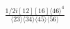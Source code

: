 \documentclass[varwidth, border=5pt]{standalone}
\begin{document}
\begin{my}
$\begin{gathered}
\scriptscriptstyle\frac{1/2i[12][16]\langle46\rangle^4}{\langle23\rangle\langle34\rangle\langle45\rangle\langle56\rangle}
\end{gathered}$
\end{my}
\end{document}
